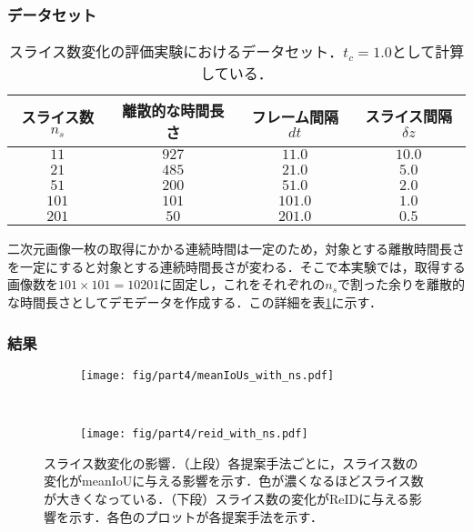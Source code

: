     \subsubsection{データセット}

    \begin{table}[t]
        \centering
        \caption[スライス数変化の評価実験におけるデータセット]{スライス数変化の評価実験におけるデータセット．$t_c = 1.0$として計算している．}
        \label{tab:ns_exp_detail}
        \begin{tabular}{c|ccc}
            スライス数$n_s$ & 離散的な時間長さ & フレーム間隔$dt$ & スライス間隔$\delta z$ 
            \\ \hline \hline
            $11$ & $927$ & $11.0$ & $10.0$
            \\ $21$ & $485$ & $21.0$ & $5.0$
            \\ $51$ & $200$ & $51.0$ & $2.0$
            \\ $101$ & $101$ & $101.0$ & $1.0$
            \\ $201$ & $50$ & $201.0$ & $0.5$
        \end{tabular}
    \end{table}

    二次元画像一枚の取得にかかる連続時間は一定のため，対象とする離散時間長さを一定にすると対象とする連続時間長さが変わる．そこで本実験では，取得する画像数を$101 \times 101 = 10201$に固定し，これをそれぞれの$n_s$で割った余りを離散的な時間長さとしてデモデータを作成する．この詳細を表\ref{tab:ns_exp_detail}に示す．

    \subsubsection{結果}

    \begin{figure}[t]
        \begin{subfigure}[t]{\linewidth}
            \centering
            \texttt{[image: fig/part4/meanIoUs\_with\_ns.pdf]}
        \end{subfigure}
        \\
        \begin{subfigure}[t]{\linewidth}
            \centering
            \texttt{[image: fig/part4/reid\_with\_ns.pdf]}
        \end{subfigure}
        \caption[スライス数変化の影響]{スライス数変化の影響．（上段）各提案手法ごとに，スライス数の変化がmeanIoUに与える影響を示す．色が濃くなるほどスライス数が大きくなっている．（下段）スライス数の変化がReIDに与える影響を示す．各色のプロットが各提案手法を示す．}
        \label{fig:ns_effect}
    \end{figure}

